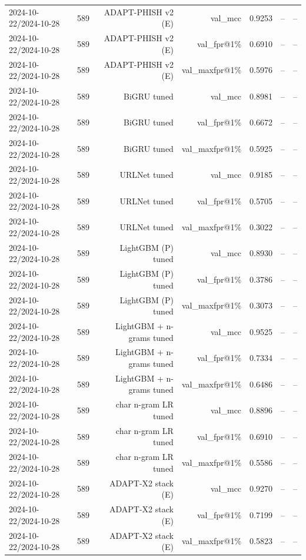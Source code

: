 \begin{table}[t]
\begin{tabular}{llrrrrr}
2024-10-22/2024-10-28 & 589 & ADAPT-PHISH v2 (E) & val\_mcc & 0.9253 & -- & -- \\
2024-10-22/2024-10-28 & 589 & ADAPT-PHISH v2 (E) & val\_fpr@1\% & 0.6910 & -- & -- \\
2024-10-22/2024-10-28 & 589 & ADAPT-PHISH v2 (E) & val\_maxfpr@1\% & 0.5976 & -- & -- \\
2024-10-22/2024-10-28 & 589 & BiGRU tuned & val\_mcc & 0.8981 & -- & -- \\
2024-10-22/2024-10-28 & 589 & BiGRU tuned & val\_fpr@1\% & 0.6672 & -- & -- \\
2024-10-22/2024-10-28 & 589 & BiGRU tuned & val\_maxfpr@1\% & 0.5925 & -- & -- \\
2024-10-22/2024-10-28 & 589 & URLNet tuned & val\_mcc & 0.9185 & -- & -- \\
2024-10-22/2024-10-28 & 589 & URLNet tuned & val\_fpr@1\% & 0.5705 & -- & -- \\
2024-10-22/2024-10-28 & 589 & URLNet tuned & val\_maxfpr@1\% & 0.3022 & -- & -- \\
2024-10-22/2024-10-28 & 589 & LightGBM (P) tuned & val\_mcc & 0.8930 & -- & -- \\
2024-10-22/2024-10-28 & 589 & LightGBM (P) tuned & val\_fpr@1\% & 0.3786 & -- & -- \\
2024-10-22/2024-10-28 & 589 & LightGBM (P) tuned & val\_maxfpr@1\% & 0.3073 & -- & -- \\
2024-10-22/2024-10-28 & 589 & LightGBM + n-grams tuned & val\_mcc & 0.9525 & -- & -- \\
2024-10-22/2024-10-28 & 589 & LightGBM + n-grams tuned & val\_fpr@1\% & 0.7334 & -- & -- \\
2024-10-22/2024-10-28 & 589 & LightGBM + n-grams tuned & val\_maxfpr@1\% & 0.6486 & -- & -- \\
2024-10-22/2024-10-28 & 589 & char n-gram LR tuned & val\_mcc & 0.8896 & -- & -- \\
2024-10-22/2024-10-28 & 589 & char n-gram LR tuned & val\_fpr@1\% & 0.6910 & -- & -- \\
2024-10-22/2024-10-28 & 589 & char n-gram LR tuned & val\_maxfpr@1\% & 0.5586 & -- & -- \\
2024-10-22/2024-10-28 & 589 & ADAPT-X2 stack (E) & val\_mcc & 0.9270 & -- & -- \\
2024-10-22/2024-10-28 & 589 & ADAPT-X2 stack (E) & val\_fpr@1\% & 0.7199 & -- & -- \\
2024-10-22/2024-10-28 & 589 & ADAPT-X2 stack (E) & val\_maxfpr@1\% & 0.5823 & -- & -- \\

\end{tabular}
\end{table}
